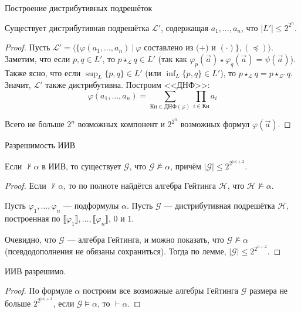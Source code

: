 \documentclass[aspectratio=169]{beamer}
\begin{document}
\begin{frame}{Построение дистрибутивных подрешёток}
\begin{lemmarus}Существует дистрибутивная подрешётка $\mathcal{L'}$, содержащая
$a_1, \dots, a_n$, что $|L'| \le 2^{2^n}$.
\end{lemmarus}
\begin{proof}
Пусть $\mathcal{L'} = \langle\{ \varphi(a_1,\dots,a_n)\ |\ \varphi \text{ составлено из (+) и }(\cdot)\}, (\preceq)\rangle$.
Заметим, что если $p,q \in L'$, то $p \star_{\mathcal{L}} q \in L'$ 
(так как $\varphi_p(\overrightarrow{a})\star\varphi_q(\overrightarrow{a}) = \psi(\overrightarrow{a})$). Также ясно,
что если $\sup_L\{p,q\} \in L'$ (или $\inf_L\{p,q\} \in L'$), то $p \star_{\mathcal{L}} q = p \star_{\mathcal{L'}} q$.
Значит, $\mathcal{L'}$ также дистрибутивна. Построим <<ДНФ>>:
$$\varphi(a_1,\dots,a_n) = \sum_{\text{Кн} \in \text{ДНФ}(\varphi)}\prod_{i \in \text{Кн}}a_i$$

Всего не больше $2^n$ возможных компонент и $2^{2^n}$ возможных формул $\varphi(\overrightarrow{a})$.
\end{proof}
\end{frame}


\begin{frame}{Разрешимость ИИВ}
\begin{thmrus}Если $\not\vdash \alpha$ в ИИВ, то существует $\mathcal{G}$,
что $\mathcal{G} \not\models \alpha$, причём $|\mathcal{G}| \le 2^{2^{|\alpha|+2}}$.
\end{thmrus}
\begin{proof}Если $\not\vdash \alpha$, то по 
полноте найдётся алгебра Гейтинга $\mathcal{H}$, что
$\mathcal{H} \not\models \alpha$. 

Пусть $\varphi_1, \dots, \varphi_n$ --- подформулы $\alpha$.
Пусть $\mathcal{G}$ --- дистрибутивная подрешётка $\mathcal{H}$, 
построенная по $\llbracket \varphi_1 \rrbracket, \dots, \llbracket \varphi_n \rrbracket$, $0$ и $1$. 

Очевидно, что $\mathcal{G}$ --- алгебра Гейтинга, и можно показать, 
что $\mathcal{G} \not\models \alpha$ (псевдодополнения не обязаны сохраниться).
Тогда по лемме, $|\mathcal{G}| \le 2^{2^{n+2}}$. 
\end{proof}

\begin{thmrus}ИИВ разрешимо.
\end{thmrus}
\begin{proof}По формуле $\alpha$ построим все возможные алгебры Гейтинга $\mathcal{G}$ размера не больше $2^{2^{|\alpha|+2}}$,
если $\mathcal{G}\models\alpha$, то $\vdash\alpha$.
\end{proof}
\end{frame}
\end{document}
